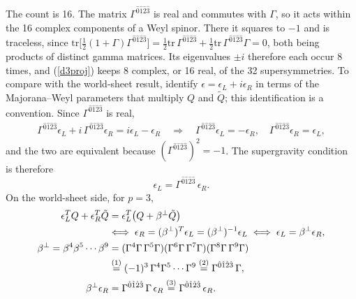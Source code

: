\begin{tcolorbox}[breakable]
\begin{remark}
The count is 16. The matrix $\Gamma^{\hat0\hat1\hat2\hat3}$ is real and commutes with $\Gamma$, so it acts within the 16 complex components of a Weyl spinor. There it squares to $-1$ and is traceless, since $\mathrm{tr}\big[\frac12(1+\Gamma)\Gamma^{\hat0\hat1\hat2\hat3}\big] = \frac12\mathrm{tr}\,\Gamma^{\hat0\hat1\hat2\hat3} + \frac12\mathrm{tr}\,\Gamma^{\hat0\hat1\hat2\hat3}\Gamma = 0$, both being products of distinct gamma matrices. Its eigenvalues $\pm i$ therefore each occur 8 times, and (\ref{d3proj}) keeps 8 complex, or 16 real, of the 32 supersymmetries. To compare with the world-sheet result, identify $\epsilon = \epsilon_L + i\epsilon_R$ in terms of the Majorana--Weyl parameters that multiply $Q$ and $\tilde Q$; this identification is a convention. Since $\Gamma^{\hat0\hat1\hat2\hat3}$ is real,
\begin{align*}
\Gamma^{\hat0\hat1\hat2\hat3}\epsilon_L + i\,\Gamma^{\hat0\hat1\hat2\hat3}\epsilon_R = i\epsilon_L - \epsilon_R
\quad\Longrightarrow\quad \Gamma^{\hat0\hat1\hat2\hat3}\epsilon_L = -\epsilon_R,\quad \Gamma^{\hat0\hat1\hat2\hat3}\epsilon_R = \epsilon_L ,
\end{align*}
and the two are equivalent because $(\Gamma^{\hat0\hat1\hat2\hat3})^2 = -1$. The supergravity condition is therefore
\begin{equation}
\epsilon_L = \Gamma^{\hat0\hat1\hat2\hat3}\,\epsilon_R .
\tag{D.17}\label{sugraLR}
\end{equation}
On the world-sheet side, for $p=3$,
\begin{align*}
\epsilon_L^TQ + \epsilon_R^T\tilde Q &= \epsilon_L^T\big(Q + \beta^\perp\tilde Q\big) \\
&\Longleftrightarrow\; \epsilon_R = (\beta^\perp)^T\epsilon_L = (\beta^\perp)^{-1}\epsilon_L \;\Longleftrightarrow\; \epsilon_L = \beta^\perp\epsilon_R , \\
\beta^\perp = \beta^4\beta^5\cdots\beta^9 &= (\Gamma^4\Gamma\,\Gamma^5\Gamma)(\Gamma^6\Gamma\,\Gamma^7\Gamma)(\Gamma^8\Gamma\,\Gamma^9\Gamma) \\
&\overset{(1)}{=} (-1)^3\,\Gamma^4\Gamma^5\cdots\Gamma^9 \overset{(2)}{=} \Gamma^{\hat0\hat1\hat2\hat3}\,\Gamma , \\
\beta^\perp\epsilon_R &= \Gamma^{\hat0\hat1\hat2\hat3}\,\Gamma\,\epsilon_R \overset{(3)}{=} \Gamma^{\hat0\hat1\hat2\hat3}\,\epsilon_R .
\end{align*}

\end{remark}
\end{tcolorbox}
